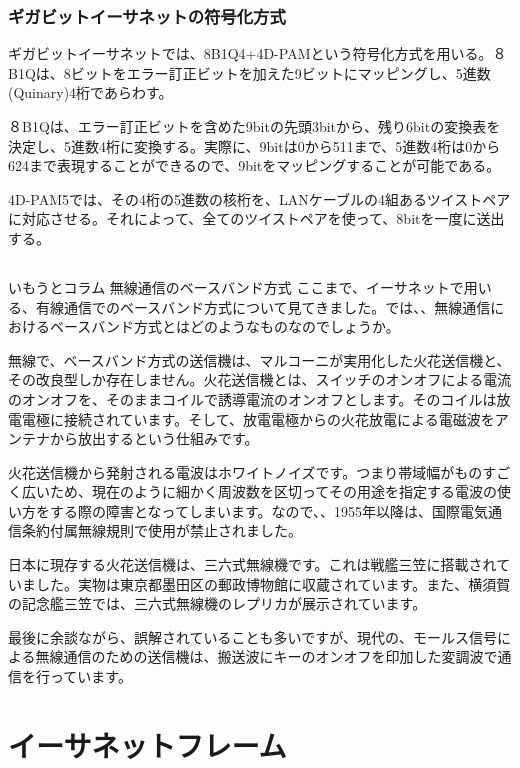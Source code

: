 \subsubsection{ギガビットイーサネットの符号化方式}
ギガビットイーサネットでは、8B1Q4+4D-PAMという符号化方式を用いる。８B1Qは、8ビットをエラー訂正ビットを加えた9ビットにマッピングし、5進数(Quinary)4桁であらわす。

８B1Qは、エラー訂正ビットを含めた9bitの先頭3bitから、残り6bitの変換表を決定し、5進数4桁に変換する。実際に、9bitは0から511まで、5進数4桁は0から624まで表現することができるので、9bitをマッピングすることが可能である。

4D-PAM5では、その4桁の5進数の核桁を、LANケーブルの4組あるツイストペアに対応させる。それによって、全てのツイストペアを使って、8bitを一度に送出する。

\subsection*{}
\begin{itembox}[l]{いもうとコラム 無線通信のベースバンド方式}
ここまで、イーサネットで用いる、有線通信でのベースバンド方式について見てきました。では、、無線通信におけるベースバンド方式とはどのようなものなのでしょうか。

無線で、ベースバンド方式の送信機は、マルコーニが実用化した火花送信機と、その改良型しか存在しません。火花送信機とは、スイッチのオンオフによる電流のオンオフを、そのままコイルで誘導電流のオンオフとします。そのコイルは放電電極に接続されています。そして、放電電極からの火花放電による電磁波をアンテナから放出するという仕組みです。

火花送信機から発射される電波はホワイトノイズです。つまり帯域幅がものすごく広いため、現在のように細かく周波数を区切ってその用途を指定する電波の使い方をする際の障害となってしまいます。なので、、1955年以降は、国際電気通信条約付属無線規則で使用が禁止されました。

日本に現存する火花送信機は、三六式無線機です。これは戦艦三笠に搭載されていました。実物は東京都墨田区の郵政博物館に収蔵されています。また、横須賀の記念艦三笠では、三六式無線機のレプリカが展示されています。

最後に余談ながら、誤解されていることも多いですが、現代の、モールス信号による無線通信のための送信機は、搬送波にキーのオンオフを印加した変調波で通信を行っています。
\end{itembox}


\section{イーサネットフレーム}

